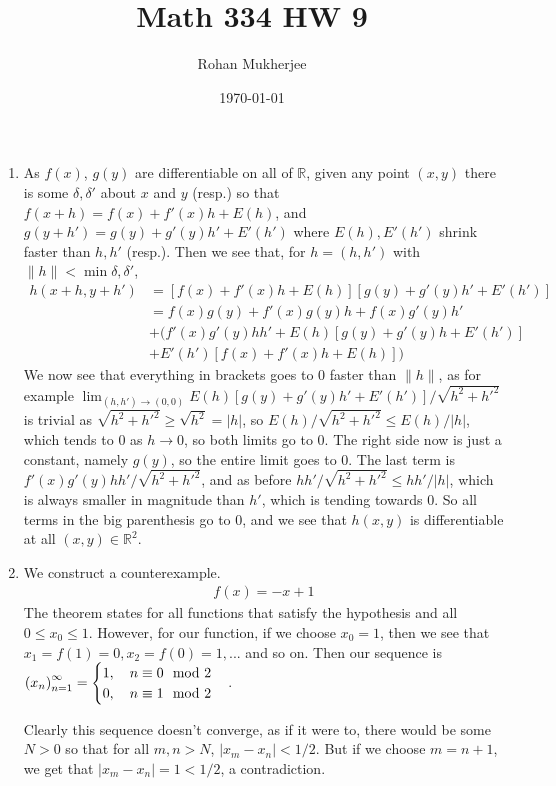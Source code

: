 \documentclass[12pt]{article}
\title{Math 334 HW 9}
\date{\today}
\author{Rohan Mukherjee}
\theoremstyle{definition}
\theoremstyle{remark}
\newcommand{\R}{\mathbb{R}}
\newcommand{\mg}[1]{\| #1 \|}
\newcommand{\seq}[2]{\qty(#1_#2)_{#2=1}^{\infty}}
\begin{document}
	\maketitle
	\begin{enumerate}[leftmargin=\labelsep]
		\item As $f(x)$, $g(y)$ are differentiable on all of $\R$, given any point $(x, y)$ there is some $\delta, \delta'$ about $x$ and $y$ (resp.) so that $f(x+h)=f(x)+f'(x)h+E(h)$, and $g(y+h')=g(y)+g'(y)h'+E'(h')$ where $E(h), E'(h')$ shrink faster than $h, h'$ (resp.). Then we see that, for $h = (h, h')$ with $\mg{h} < \min{\delta, \delta'}$, 
		\begin{align*}
			h(x+h, y+h') &= [f(x)+f'(x)h+E(h)][g(y)+g'(y)h'+E'(h')]
			\\&= f(x)g(y)+f'(x)g(y)h + f(x)g'(y)h' 
			\\&+ \big(f'(x)g'(y)hh'+E(h)[g(y)+g'(y)h+E'(h')]
			\\&+ E'(h')[f(x)+f'(x)h+E(h)]\big)
		\end{align*}
		We now see that everything in brackets goes to 0 faster than $\mg{h}$, as for example $\lim_{(h, h') \to (0, 0)} E(h)[g(y)+g'(y)h'+E'(h')]/\sqrt{h^2+h'^2}$ is trivial as $\sqrt{h^2+h'^2} \geq \sqrt{h^2}=|h|$, so $E(h)/\sqrt{h^2+h'^2} \leq E(h)/|h|$, which tends to $0$ as $h \to 0$, so both limits go to $0$. The right side now is just a constant, namely $g(y)$, so the entire limit goes to 0. The last term is $f'(x)g'(y)hh'/\sqrt{h^2+h'^2}$, and as before $hh'/\sqrt{h^2+h'^2} \leq hh'/|h|$, which is always smaller in magnitude than $h'$, which is tending towards 0. So all terms in the big parenthesis go to 0, and we see that $h(x, y)$ is differentiable at all $(x, y) \in \R^2$.
		
		\item 
		We construct a counterexample.
		\begin{align*}
			f(x) = -x + 1
		\end{align*}
		The theorem states for all functions that satisfy the hypothesis and all $0 \leq x_0 \leq 1$. However, for our function, if we choose $x_0 = 1$, then we see that $x_1 = f(1)=0, x_2 = f(0)=1, ...$ and so on. Then our sequence is $\seq{x}{n} = 
		\begin{cases}
			1, \quad n \equiv 0 \mod{2}\\
			0, \quad n \equiv 1 \mod{2}
		\end{cases}$.
	
		Clearly this sequence doesn't converge, as if it were to, there would be some $N > 0$ so that for all $m, n > N$, $|x_m-x_n| < 1/2$. But if we choose $m = n+1$, we get that $|x_m-x_n| = 1 < 1/2$, a contradiction.
		

\end{enumerate}
\end{document}
